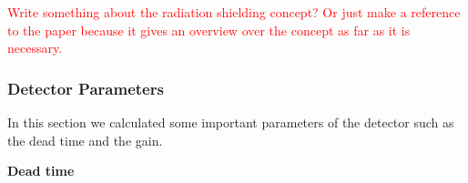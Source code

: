 		\textcolor{red}{Write something about the radiation shielding concept? Or just make a reference to the paper because it gives an overview over the concept as far as it is necessary.}
		
		\subsubsection{Detector Parameters} %
		
		In this section we calculated some important parameters of the detector such as the dead time and the gain. %
		
		\textbf{Dead time}\\
		
